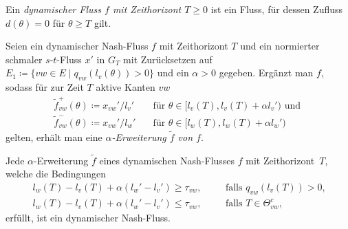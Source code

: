 \begin{frame}
	\begin{definition}
		Ein \emph{dynamischer Fluss $f$ mit Zeithorizont $T\geq0$} ist ein Fluss, für dessen Zufluss $d(\theta)= 0$ für $\theta\geq T$ gilt.
	\end{definition}

	\pause\begin{definition}
		Seien ein dynamischer Nash-Fluss $f$ mit Zeithorizont $T$ und ein normierter schmaler $s$-$t$-Fluss $x'$ in $G_T$ mit Zurücksetzen auf $E_1 \coloneq \{ vw\in E \mid q_{vw}(l_v(\theta)) > 0 \}$ und ein $\alpha > 0$ gegeben.
		Ergänzt man $f$, sodass für zur Zeit $T$ aktive Kanten $vw$
		\begin{align*}
			\tilde{f}_{vw}^+(\theta)\coloneq x_{vw}'/l_v'& \text{~~~für $\theta\in [l_v(T), l_v(T)+\alpha l_v')$ und } \\
			\tilde{f}_{vw}^-(\theta)\coloneq x_{vw}'/l_w'& \text{~~~für $\theta\in [l_w(T), l_w(T)+\alpha l_w')$}
		\end{align*}
		gelten, erhält man eine \emph{$\alpha$-Erweiterung $\tilde{f}$ von $f$}.
	\end{definition}
\end{frame}

\begin{frame}
	\begin{theorem}
		Jede $\alpha$-Erweiterung $\tilde{f}$ eines dynamischen Nash-Flusses $f$ mit Zeithorizont~$T$, welche die Bedingungen
		\begin{align*}
			l_w(T) - l_v(T) + \alpha(l_w' - l_v') \geq \tau_{vw}, &\text{ ~~~~falls $q_{vw}(l_v(T)) > 0$,}\\
			l_w(T) - l_v(T) + \alpha(l_w' - l_v') \leq \tau_{vw}, &\text{ ~~~~falls $T\in\Theta_{vw}^c $,}
		\end{align*}
		erfüllt, ist ein dynamischer Nash-Fluss.
	\end{theorem}
\end{frame}
